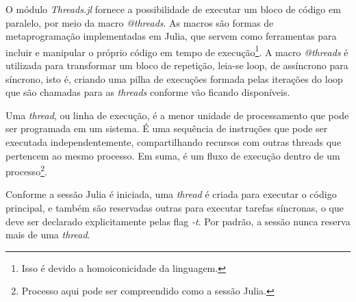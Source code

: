 O módulo \emph{Threads.jl} fornece a possibilidade de executar um bloco de código em paralelo, por meio da macro \emph{@threads}. As macros são formas de metaprogramação implementadas em Julia, que servem como ferramentas para incluir e manipular o próprio código em tempo de execução\footnote{Isso é devido a homoiconicidade da linguagem.}. A macro \emph{@threads} é utilizada para transformar um bloco de repetição, leia-se loop, de assíncrono para síncrono, isto é, criando uma pilha de execuções formada pelas iterações do loop que são chamadas para as \emph{threads} conforme vão ficando disponíveis.

Uma \emph{thread}, ou linha de execução, é a menor unidade de processamento que pode ser programada em um sistema. É uma sequência de instruções que pode ser executada independentemente, compartilhando recursos com outras threads que pertencem ao mesmo processo. Em suma, é um fluxo de execução dentro de um processo\footnote{Processo aqui pode ser compreendido como a sessão Julia.}. \cite{ivob}

Conforme a sessão Julia é iniciada, uma \emph{thread} é criada para executar o código principal, e também são reservadas outras para executar tarefas síncronas, o que deve ser declarado explicitamente pelas flag \emph{-t}. Por padrão, a sessão nunca reserva mais de uma \emph{thread}.


